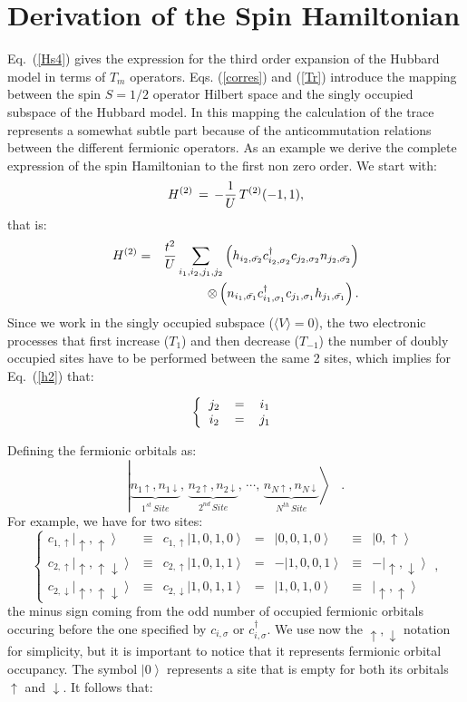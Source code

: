 \documentclass[aps,prb,twocolumn,superscriptaddress,
               amsmath]{revtex4}
\newcommand{\eqn}[1]{\vspace{-0.cm}\begin{equation}
#1
\end{equation}}
\renewcommand{\=}{\,=\,}
\newcommand{\+}{\,+\,}
\renewcommand{\-}{\,-\,}
\newcommand{\f}[2]{{\ensuremath{\mathchoice%
        {\dfrac{#1}{#2}}
        {\dfrac{#1}{#2}}
        {\frac{#1}{#2}}
        {\frac{#1}{#2}}
        }}}
\newcommand{\ket}[1]{\ensuremath{\left| #1 \right\rangle}}
\begin{document}
\section{Derivation of the Spin Hamiltonian\label{SH}}
Eq.~(\ref{Hs4}) gives the expression for the
third order expansion of the Hubbard model in terms of $T_m$ operators.
Eqs. (\ref{corres}) and (\ref{Tr}) introduce the mapping between the
spin $S=1/2$  operator Hilbert space and the singly occupied
subspace of the Hubbard model. In this mapping the calculation
of the trace represents a somewhat subtle part because of the
anticommutation relations between the different fermionic operators.
As an example we derive the complete expression of the spin Hamiltonian to the
first non zero order. We start with:
\eqn{H^{(2)} \= -\f{1}{U} \, T^{(2)}(-1,1),}
that is:
\begin{eqnarray}
H^{(2)} & = &\f{t^2}{U} \sum_{i_1,i_2,j_1,j_2}  \left(h_{i_2,\bar{\sigma_2}} c_{i_2,{\sigma_2}}^{\dag} c_{j_2,{\sigma_2}} n_{j_2,\bar{\sigma_2}}\right)\nonumber\\
&& \otimes \left(n_{i_1,\bar{\sigma_1}} c_{i_1,{\sigma_1}}^{\dag} c_{j_1,{\sigma_1}} h_{j_1,\bar{\sigma_1}}\right)\label{h2}.
\end{eqnarray}
Since we work in the singly occupied subspace
($\langle V \rangle = 0$),  the  two electronic
processes that first increase ($T_1$) and
then decrease ($T_{-1}$) the number of
doubly occupied sites have to be performed
between the same 2 sites, which implies for Eq.~(\ref{h2}) that:

\eqn{\left\{\begin{tabular}{ccc}
$j_2$& =& $i_1$\\
$i_2$& =& $j_1$
\end{tabular}\right.}

Defining the fermionic orbitals as:
\eqn{\ket{\underbrace{n_{1\uparrow},n_{1\downarrow}}_{1^{st}\, Site},\,
\underbrace{n_{2\uparrow},n_{2\downarrow}}_{2^{nd}\, Site},\,\cdots
,\,\underbrace{n_{N\uparrow},n_{N\downarrow}}_{N^{th}\, Site}}
\;\;\; .}
For example, we have for two sites:
\eqn{\left\{
\begin{array}{ccccrcr}
c_{1,\uparrow} \ket{\uparrow,\uparrow}& \equiv & c_{1,\uparrow} \ket{1,0,1,0} & = & \ket{0,0,1,0} & \equiv & \ket{0,\uparrow} \\
c_{2,\uparrow} \ket{\uparrow,\uparrow\downarrow}& \equiv & c_{2,\uparrow} \ket{1,0,1,1}  & = & -\ket{1,0,0,1} & \equiv & - \ket{\uparrow,\downarrow}\\
c_{2,\downarrow} \ket{\uparrow,\uparrow\downarrow}& \equiv & c_{2,\downarrow} \ket{1,0,1,1} & = & \ket{1,0,1,0} & \equiv & \ket{\uparrow,\uparrow}
\end{array} \right.,}
the minus sign coming from the odd number of
occupied fermionic orbitals occuring before the one
specified by $c_{i,\sigma}$ or $c_{i,\sigma}^{\dag}$.
We use now the $\uparrow,\downarrow$ notation for simplicity,
but it is important to notice that it represents fermionic
orbital occupancy. The symbol $\ket{0}$ represents a site that is
empty for both its orbitals $\uparrow$ and $\downarrow$.
It follows that:
\end{document}
